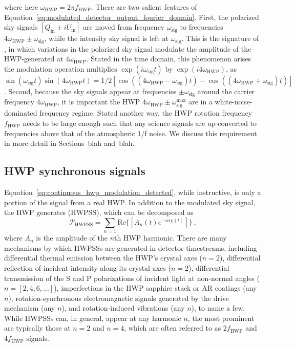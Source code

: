 where here $\omega_{\mathrm{HWP}} = 2 \pi f_{\mathrm{HWP}}$. There are two salient features of Equation~\ref{eq:modulated_detector_output_fourier_domain}. First, the polarized sky signals $\left[ Q_{\mathrm{in}} \pm i U_{\mathrm{in}} \right]$ are moved from frequency $\omega_{\mathrm{sig}}$ to frequencies $4 \omega_{\mathrm{HWP}} \pm \omega_{\mathrm{sig}}$, while the intensity sky signal is left at $\omega_{\mathrm{sig}}$. This is the signature of , in which variations in the polarized sky signal modulate the amplitude of the HWP-generated  at $4 \omega_{\mathrm{HWP}}$. Stated in the time domain, this phenomenon arises the modulation operation multiplies $\exp(i \omega_{\mathrm{sig}} t)$ by $\exp(i 4 \omega_{\mathrm{HWP}})$, as $\sin(\omega_{\mathrm{sig}} t) \sin(4 \omega_{\mathrm{HWP}} t) = 1/2 [\cos((4 \omega_{\mathrm{HWP}} - \omega_{\mathrm{sig}}) t) - \cos((4 \omega_{\mathrm{HWP}} + \omega_{\mathrm{sig}}) t) ]$. Second, because the sky signals appear at frequencies $\pm \omega_{\mathrm{sig}}$ around the carrier frequency $4 \omega_{\mathrm{HWP}}$, it is important the HWP  $4 \omega_{\mathrm{HWP}} \pm \omega_{\mathrm{sig}}^{\mathrm{max}}$ are in a white-noise-dominated frequency regime. Stated another way, the HWP rotation frequency $f_{\mathrm{HWP}}$ needs to be large enough such that any science signals are up-converted to frequencies above that of the atmospheric 1/f noise. We discuss this requirement in more detail in Sections~blah and~blah.


\subsection{HWP synchronous signals}
\label{sec:hwp_synchronous_signals}

Equation~\ref{eq:continuous_hwp_modulation_detected}, while instructive, is only a portion of the signal from a real HWP. In addition to the modulated sky signal, the HWP generates  (HWPSS), which can be decomposed as
\begin{equation}
    \mathcal{P}_{\mathrm{HWPSS}} = \sum_{n = 1} \mathrm{Re}\{ \left[ A_{n}(t) e^{-i n \chi(t)} \right] \} \, ,
    \label{eq:hwpss}
\end{equation}
where $A_{n}$ is the amplitude of the $n$th HWP harmonic. There are many mechanisms by which HWPSSs are generated in detector timestreams, including differential thermal emission between the HWP's crystal axes ($n = 2$), differential reflection of incident intensity along its crystal axes ($n = 2$), differential transmission of the S and P polarizations of incident light at non-normal angles ($n = [2, 4, 6, ...]$), imperfections in the HWP sapphire stack or AR coatings (any $n$), rotation-synchronous electromagnetic signals generated by the drive mechanism (any $n$), and rotation-induced vibrations (any $n$), to name a few. While HWPSSs can, in general, appear at any harmonic $n$, the most prominent are typically those at $n = 2$ and $n = 4$, which are often referred to as $2 f_{\mathrm{HWP}}$ and $4 f_{\mathrm{HWP}}$ signals.

